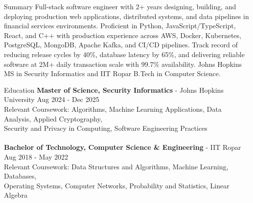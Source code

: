 \documentclass{resume}
\begin{document}
\begin{rSection}{Summary}
Full-stack software engineer with 2+ years designing, building, and deploying production web applications, distributed systems, and data pipelines in financial services environments. Proficient in Python, JavaScript/TypeScript, React, and C++ with production experience across AWS, Docker, Kubernetes, PostgreSQL, MongoDB, Apache Kafka, and CI/CD pipelines. Track record of reducing release cycles by 40\%, database latency by 65\%, and delivering reliable software at 2M+ daily transaction scale with 99.7\% availability. Johns Hopkins MS in Security Informatics and IIT Ropar B.Tech in Computer Science.
\end{rSection}

\vspace{-4mm}

\begin{rSection}{Education}
{\bf Master of Science, Security Informatics} - Johns Hopkins University \hfill {Aug 2024 - Dec 2025}\\
Relevant Coursework: Algorithms, Machine Learning Applications, Data Analysis, Applied Cryptography, \\
\vspace{-2mm}
Security and Privacy in Computing, Software Engineering Practices\\
\vspace{-4mm}\\
{\bf Bachelor of Technology, Computer Science \& Engineering} - IIT Ropar \hfill {Aug 2018 - May 2022}\\
Relevant Coursework: Data Structures and Algorithms, Machine Learning, Databases, \\
\vspace{-2mm}
Operating Systems, Computer Networks, Probability and Statistics, Linear Algebra
\end{rSection}

\vspace{-4mm}
\end{document}
